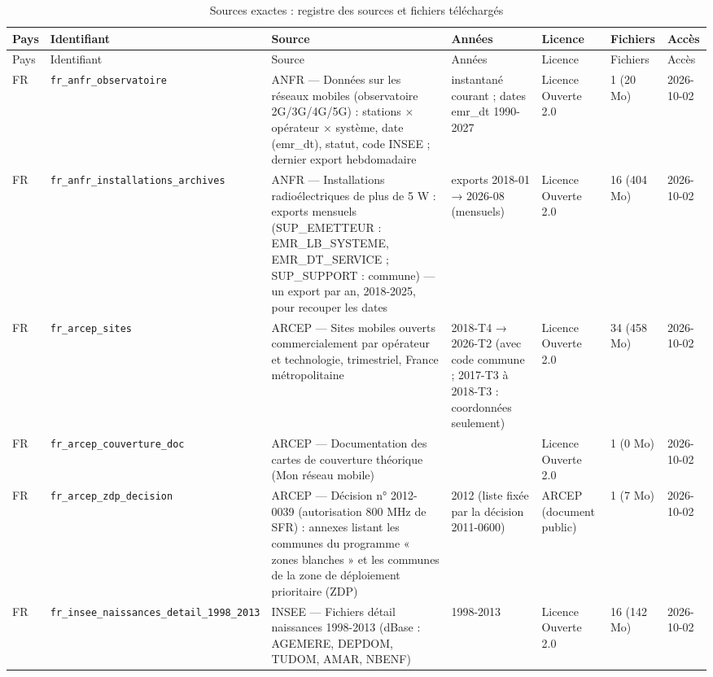 \begin{longtable}{lp{2.2cm}p{3.9cm}p{2.1cm}p{1.9cm}p{1.4cm}p{1.6cm}}
\caption{Sources exactes : registre des sources et fichiers téléchargés}\label{tab:sources}\\
\toprule
Pays & Identifiant & Source & Années & Licence & Fichiers & Accès \\
\midrule
\endfirsthead
\toprule
Pays & Identifiant & Source & Années & Licence & Fichiers & Accès \\
\midrule
\endhead
\bottomrule
\endfoot
FR & \texttt{fr\_\allowbreak{}anfr\_\allowbreak{}observatoire} & ANFR — Données sur les réseaux mobiles (observatoire 2G/3G/4G/5G) : stations × opérateur × système, date (emr\_\allowbreak{}dt), statut, code INSEE ; dernier export hebdomadaire & instantané courant ; dates emr\_dt 1990-2027 & Licence Ouverte 2.0 & 1 (20 Mo) & 2026-10-02 \\
FR & \texttt{fr\_\allowbreak{}anfr\_\allowbreak{}installations\_\allowbreak{}archives} & ANFR — Installations radioélectriques de plus de 5 W : exports mensuels (SUP\_\allowbreak{}EMETTEUR : EMR\_\allowbreak{}LB\_\allowbreak{}SYSTEME, EMR\_\allowbreak{}DT\_\allowbreak{}SERVICE ; SUP\_\allowbreak{}SUPPORT : commune) — un export par an, 2018-2025, pour recouper les dates & exports 2018-01 → 2026-08 (mensuels) & Licence Ouverte 2.0 & 16 (404 Mo) & 2026-10-02 \\
FR & \texttt{fr\_\allowbreak{}arcep\_\allowbreak{}sites} & ARCEP — Sites mobiles ouverts commercialement par opérateur et technologie, trimestriel, France métropolitaine & 2018-T4 → 2026-T2 (avec code commune ; 2017-T3 à 2018-T3 : coordonnées seulement) & Licence Ouverte 2.0 & 34 (458 Mo) & 2026-10-02 \\
FR & \texttt{fr\_\allowbreak{}arcep\_\allowbreak{}couverture\_\allowbreak{}doc} & ARCEP — Documentation des cartes de couverture théorique (Mon réseau mobile) &  & Licence Ouverte 2.0 & 1 (0 Mo) & 2026-10-02 \\
FR & \texttt{fr\_\allowbreak{}arcep\_\allowbreak{}zdp\_\allowbreak{}decision} & ARCEP — Décision n° 2012-0039 (autorisation 800 MHz de SFR) : annexes listant les communes du programme « zones blanches » et les communes de la zone de déploiement prioritaire (ZDP) & 2012 (liste fixée par la décision 2011-0600) & ARCEP (document public) & 1 (7 Mo) & 2026-10-02 \\
FR & \texttt{fr\_\allowbreak{}insee\_\allowbreak{}naissances\_\allowbreak{}detail\_\allowbreak{}1998\_\allowbreak{}2013} & INSEE — Fichiers détail naissances 1998-2013 (dBase : AGEMERE, DEPDOM, TUDOM, AMAR, NBENF) & 1998-2013 & Licence Ouverte 2.0 & 16 (142 Mo) & 2026-10-02 \\

\end{longtable}
